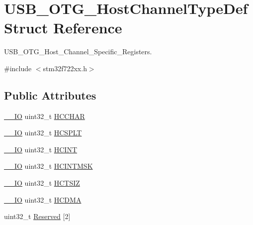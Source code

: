 \hypertarget{struct_u_s_b___o_t_g___host_channel_type_def}{}\section{U\+S\+B\+\_\+\+O\+T\+G\+\_\+\+Host\+Channel\+Type\+Def Struct Reference}
\label{struct_u_s_b___o_t_g___host_channel_type_def}


U\+S\+B\+\_\+\+O\+T\+G\+\_\+\+Host\+\_\+\+Channel\+\_\+\+Specific\+\_\+\+Registers.  




{\ttfamily \#include $<$stm32f722xx.\+h$>$}

\subsection*{Public Attributes}
\begin{DoxyCompactItemize}
\item 
\mbox{\hyperlink{core__sc300_8h_aec43007d9998a0a0e01faede4133d6be}{\+\_\+\+\_\+\+IO}} uint32\+\_\+t \mbox{\hyperlink{struct_u_s_b___o_t_g___host_channel_type_def_a6f1e046a654010fb0da5eec942fb9a8d}{H\+C\+C\+H\+AR}}
\item 
\mbox{\hyperlink{core__sc300_8h_aec43007d9998a0a0e01faede4133d6be}{\+\_\+\+\_\+\+IO}} uint32\+\_\+t \mbox{\hyperlink{struct_u_s_b___o_t_g___host_channel_type_def_a23b3abb27cf5acff0edc709c90e2e5cb}{H\+C\+S\+P\+LT}}
\item 
\mbox{\hyperlink{core__sc300_8h_aec43007d9998a0a0e01faede4133d6be}{\+\_\+\+\_\+\+IO}} uint32\+\_\+t \mbox{\hyperlink{struct_u_s_b___o_t_g___host_channel_type_def_a6735bbd8fbc28f897f1b44df95f52873}{H\+C\+I\+NT}}
\item 
\mbox{\hyperlink{core__sc300_8h_aec43007d9998a0a0e01faede4133d6be}{\+\_\+\+\_\+\+IO}} uint32\+\_\+t \mbox{\hyperlink{struct_u_s_b___o_t_g___host_channel_type_def_a8edfae19390d323525449d2444e93984}{H\+C\+I\+N\+T\+M\+SK}}
\item 
\mbox{\hyperlink{core__sc300_8h_aec43007d9998a0a0e01faede4133d6be}{\+\_\+\+\_\+\+IO}} uint32\+\_\+t \mbox{\hyperlink{struct_u_s_b___o_t_g___host_channel_type_def_a14cb8c8dbbafdef182c82c0493ca48ab}{H\+C\+T\+S\+IZ}}
\item 
\mbox{\hyperlink{core__sc300_8h_aec43007d9998a0a0e01faede4133d6be}{\+\_\+\+\_\+\+IO}} uint32\+\_\+t \mbox{\hyperlink{struct_u_s_b___o_t_g___host_channel_type_def_a4204a2dcbc14fb11d371fc45b9f3170f}{H\+C\+D\+MA}}
\item 
uint32\+\_\+t \mbox{\hyperlink{struct_u_s_b___o_t_g___host_channel_type_def_aa85d014d19b79d61bed7fdf134ed1037}{Reserved}} \mbox{[}2\mbox{]}
\end{DoxyCompactItemize}


